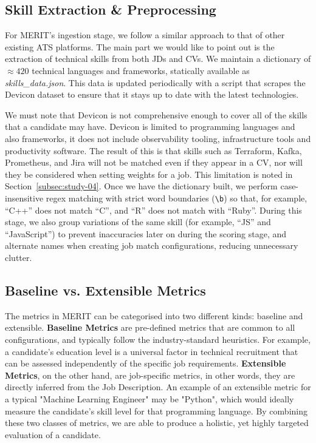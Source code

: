 \subsection{Skill Extraction \& Preprocessing}

For MERIT's ingestion stage, we follow a similar approach to that of other existing ATS platforms.
The main part we would like to point out is the extraction of technical skills from both JDs and CVs.
We maintain a dictionary of $\approx 420$ technical languages and frameworks, statically available as
\textit{skills\_data.json}. This data is updated periodically with a script that scrapes the Devicon dataset to ensure
that it stays up to date with the latest technologies. 

We must note that Devicon is not comprehensive enough to cover all of the skills that a candidate may have.
Devicon is limited to programming languages and also frameworks, it does not include observability tooling,
infrastructure tools and productivity software. The result of this is that skills such as Terraform, Kafka, Prometheus, and
Jira will not be matched even if they appear in a CV, nor will they be considered when setting weights for a job.
This limitation is noted in Section~\ref{subsec:study-04}.
Once we have the dictionary built, we perform case-insensitive regex matching
with strict word boundaries (\verb|\b|) so that, for example, ``C++'' does not match ``C'', and ``R'' does not match with ``Ruby''.
During this stage, we also group variations of the same skill (for example, ``JS'' and ``JavaScript'') to prevent inaccuracies
later on during the scoring stage, and alternate names when creating job match configurations, reducing unnecessary clutter.

\subsection{Baseline vs. Extensible Metrics}
The metrics in MERIT can be categorised into two different kinds: baseline and extensible.
\textbf{Baseline Metrics} are pre-defined metrics that are common to all configurations, and typically follow the industry-standard
heuristics. For example, a candidate's education level is a universal factor in technical recruitment that can be assessed
independently of the specific job requirements. \textbf{Extensible Metrics}, on the other hand, are job-specific metrics, in other words,
they are directly inferred from the Job Description. An example of an extensible metric for a typical "Machine Learning Engineer"
may be "Python", which would ideally measure the candidate's skill level for that programming language. By combining these
two classes of metrics, we are able to produce a holistic, yet highly targeted evaluation of a candidate.

